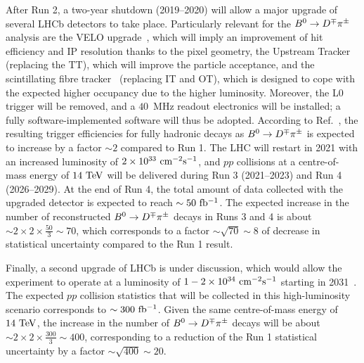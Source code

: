 After Run 2, a two-year shutdown (2019--2020) will allow 
a major upgrade of several LHCb detectors to take place. Particularly relevant for the $B^0\rightarrow D^\mp\pi^\pm$ analysis
are the VELO upgrade~\cite{LHCb-TDR-013}, which will imply an improvement of hit efficiency and IP resolution thanks to the pixel geometry,
the Upstream Tracker~\cite{Collaboration:1647400} (replacing the TT), which will improve the particle acceptance,  
and the scintillating
fibre tracker~\cite{Collaboration:1647400} (replacing IT and OT), which is designed to cope with the expected higher occupancy due to the higher luminosity.
Moreover, the L0 trigger will be removed, and a $40$~MHz readout electronics will be installed; a fully software-implemented software will thus be adopted.
According to Ref.~\cite{LHCb-PUB-2014-040}, the resulting trigger efficiencies for fully hadronic decays as $B^0\rightarrow D^\mp\pi^\pm$ is expected to
increase by a factor $\sim 2$ compared to Run 1.
The LHC will restart in 2021 with an increased luminosity of $2\times 10^{33}~\rm cm^{-2}s^{-1}$,
and $pp$ collisions at a centre-of-mass energy of $14~\rm TeV$ will be delivered during Run 3 (2021--2023) and Run 4 (2026--2029).
At the end of Run 4, the total amount of data collected with the upgraded detector is expected to reach $\sim 50~\rm fb^{-1}$. 
The expected increase in the number of reconstructed $B^0\rightarrow D^\mp\pi^\pm$ decays
in Runs 3 and 4 is about $\sim 2\times 2\times \frac{50}{3}\sim 70$, which corresponds to a factor $\sim\sqrt{70}\sim 8$ of decrease in statistical uncertainty
compared to the Run 1 result.

Finally, a second upgrade of LHCb is under discussion, which would allow the experiment
to operate at a luminosity of $1-2\times 10^{34}~\rm cm^{-2}s^{-1}$ starting in 2031~\cite{Upgrade2}.
The expected $pp$ collision statistics that will be collected in this high-luminosity scenario corresponds to $\sim 300~\rm fb^{-1}$.
Given the same centre-of-mass energy of $14~\rm TeV$, the increase in the number of $B^0\rightarrow D^\mp\pi^\pm$ decays will be about $\sim 2\times2\times \frac{300}{3}\sim 400$, corresponding to a reduction of the Run 1 statistical uncertainty by a factor $\sim\sqrt{400}\sim 20$.


